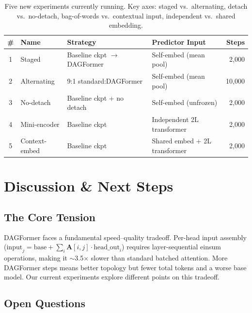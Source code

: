 \documentclass[11pt,a4paper]{article}
\newcommand{\A}{\mathbf{A}}
\begin{document}
\begin{table}[H]
\centering
\small
\begin{tabular}{clllr}
\toprule
\textbf{\#} & \textbf{Name} & \textbf{Strategy} & \textbf{Predictor Input} & \textbf{Steps} \\
\midrule
1 & Staged         & Baseline ckpt $\to$ DAGFormer    & Self-embed (mean pool)            & 2,000  \\
2 & Alternating    & 9:1 standard:DAGFormer           & Self-embed (mean pool)            & 10,000 \\
3 & No-detach      & Baseline ckpt + no detach        & Self-embed (unfrozen)             & 2,000  \\
4 & Mini-encoder   & Baseline ckpt                    & Independent 2L transformer        & 2,000  \\
5 & Context-embed  & Baseline ckpt                    & Shared embed + 2L transformer     & 2,000  \\
\bottomrule
\end{tabular}
\caption{Five new experiments currently running. Key axes: staged vs.\ alternating, detach vs.\ no-detach, bag-of-words vs.\ contextual input, independent vs.\ shared embedding.}
\label{tab:current}
\end{table}


\section{Discussion \& Next Steps}

\subsection{The Core Tension}

DAGFormer faces a fundamental speed--quality tradeoff. Per-head input assembly ($\text{input}_j = \text{base} + \sum_i \A[i,j] \cdot \text{head\_out}_i$) requires layer-sequential einsum operations, making it $\sim$3.5$\times$ slower than standard batched attention. More DAGFormer steps means better topology but fewer total tokens and a worse base model. Our current experiments explore different points on this tradeoff.

\subsection{Open Questions}
\end{document}
